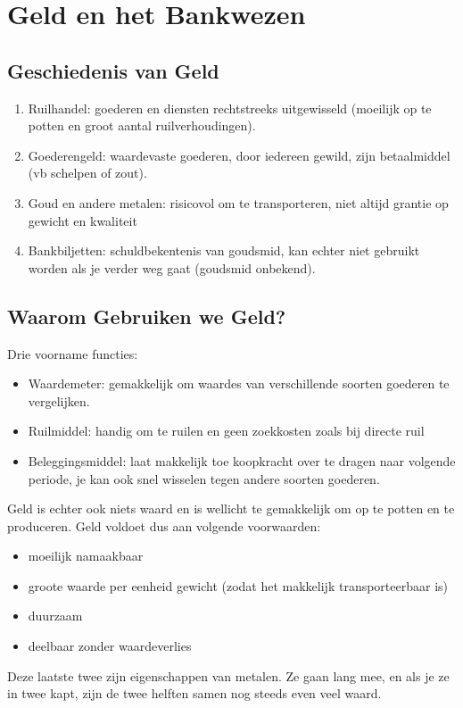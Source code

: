 \section{Geld en het Bankwezen}
\label{sec:Geld en het Bankwezen}

\subsection{Geschiedenis van Geld}
\label{sub:Geschiedenis van Geld}
\begin{enumerate}
  \item Ruilhandel: goederen en diensten rechtstreeks uitgewisseld (moeilijk op te potten en groot aantal ruilverhoudingen).
  \item Goederengeld: waardevaste goederen, door iedereen gewild, zijn betaalmiddel (vb schelpen of zout).
  \item Goud en andere metalen: risicovol om te transporteren, niet altijd grantie op gewicht en kwaliteit
  \item Bankbiljetten: schuldbekentenis van goudsmid, kan echter niet gebruikt worden als je verder weg gaat (goudsmid onbekend).
\end{enumerate}

\subsection{Waarom Gebruiken we Geld?}
\label{sub:Waarom Gebruiken we Geld?}
Drie voorname functies:
\begin{itemize}
  \item Waardemeter: gemakkelijk om waardes van verschillende soorten goederen te vergelijken.
  \item Ruilmiddel: handig om te ruilen en geen zoekkosten zoals bij directe ruil
  \item Beleggingsmiddel: laat makkelijk toe koopkracht over te dragen naar volgende periode, je kan ook snel wisselen tegen andere soorten goederen.
\end{itemize}

Geld is echter ook niets waard en is wellicht te gemakkelijk om op te potten en te produceren. Geld voldoet dus aan volgende voorwaarden:
\begin{itemize}
  \item moeilijk namaakbaar
  \item groote waarde per eenheid gewicht (zodat het makkelijk transporteerbaar is)
  \item duurzaam
  \item deelbaar zonder waardeverlies
\end{itemize}
Deze laatste twee zijn eigenschappen van metalen. Ze gaan lang mee, en als je ze in twee kapt, zijn de twee helften samen nog steeds even veel waard.



